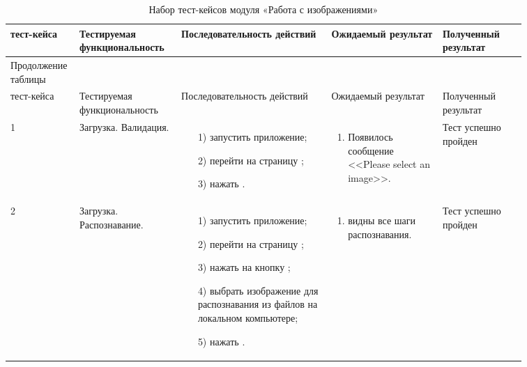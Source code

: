 \begin{longtable}{| >{\raggedright}m{0.06\linewidth} 
                  | >{\raggedright}m{0.18\linewidth} 
                  | >{\raggedright}m{0.27\linewidth} 
                  | >{\raggedright}m{0.2\linewidth} 
                  | >{\raggedright\arraybackslash}m{0.15\linewidth}|}
	\caption{Набор тест-кейсов модуля «Работа с изображениями»}
	\label{table:testing:own_content} \\

   \hline
   \No{} тест-кейса & Тестируемая функциональность & Последовательность действий & Ожидаемый результат & Полученный результат\\
   \endfirsthead

	\multicolumn{3}{@{} l}%
	{{Продолжение таблицы \thetable{}}} \\

	\hline
   	\No{} тест-кейса & Тестируемая функциональность & Последовательность действий & Ожидаемый результат & Полученный результат\\

	\hline 
	\endhead

	\hline
	1 & Загрузка. Валидация. & 
   			\begin{enumerate}
				\item[1)] запустить приложение;
				\item[2)] перейти на страницу \imrPage{};
				\item[3)] нажать \submitButton{}.
			\end{enumerate}
   			& 
   			\begin{enumerate}
   				\item Появилось сообщение <<Please select an image>>.
   			\end{enumerate}
   			& Тест успешно пройден \\
	
	2 & Загрузка. Распознавание. & 
   			\begin{enumerate}
				\item[1)] запустить приложение;
				\item[2)] перейти на страницу \imrPage{};
				\item[3)] нажать на кнопку \selectButton{};
				\item[4)] выбрать изображение для распознавания из файлов на локальном компьютере;
				\item[5)] нажать \submitButton{}.
			\end{enumerate}
   			& 
   			\begin{enumerate}
   				\item видны все шаги распознавания.
   			\end{enumerate}
   			& Тест успешно пройден \\ 


\end{longtable}

